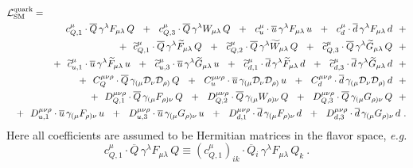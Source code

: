 \documentclass[12pt,preprintnumbers,nofootinbib]{revtex4}
\newcommand{\wt}{\widetilde}
\newcommand{\ov}{\overline}
\newcommand{\md}{\mathcal{D}}
\begin{document}
\begin{eqnarray}
\nonumber
\lefteqn{
	\mathcal{L}_{\rm SM}^{\rm quark} =
	}
	\\
\nonumber
	&&
	\phantom{+~~}
	c_{Q,1}^\mu \cdot
	\ov{Q}\, \gamma^\lambda F_{\mu\lambda}\, Q 
	~~+~~
	c_{Q,3}^\mu \cdot
	\ov{Q}\, \gamma^\lambda W_{\mu\lambda}\, Q 
	~~+~~
	c_{u}^\mu \cdot
	\ov{u}\, \gamma^\lambda F_{\mu\lambda}\, u
	~~+~~ 
	c_{d}^\mu \cdot
	\ov{d}\, \gamma^\lambda F_{\mu\lambda}\, d
	~~+
	\\
\label{SM_quark}
	&&
	+~~
	\wt{c}_{Q,1}^\mu \cdot
	\ov{Q}\, \gamma^\lambda \wt{F}_{\mu\lambda}\, Q 
	~~+~~
	\wt{c}_{Q,2}^\mu \cdot
	\ov{Q}\, \gamma^\lambda \wt{W}_{\mu\lambda}\, Q 
	~~+~~
	\wt{c}_{Q,3}^\mu \cdot
	\ov{Q}\, \gamma^\lambda \wt{G}_{\mu\lambda}\, Q 
	~~+
	\\
\nonumber
	&&
	+~~
	\wt{c}_{u,1}^\mu \cdot
	\ov{u}\, \gamma^\lambda \wt{F}_{\mu\lambda}\, u
	~~+~~ 
	\wt{c}_{u,3}^\mu \cdot
	\ov{u}\, \gamma^\lambda \wt{G}_{\mu\lambda}\, u
	~~+~~ 
	\wt{c}_{d,1}^\mu \cdot
	\ov{d}\, \gamma^\lambda \wt{F}_{\mu\lambda}\, d
	~~+~~ 
	\wt{c}_{d,3}^\mu \cdot
	\ov{d}\, \gamma^\lambda \wt{G}_{\mu\lambda}\, d
	~~+
	\\
\nonumber
	&&
	+~~
	C_Q^{\mu\nu\rho} \cdot
	\ov{Q}\, \gamma_{(\mu} \md_\nu \md_{\rho)}\, Q
	~~+~~
	C_u^{\mu\nu\rho} \cdot
	\ov{u}\, \gamma_{(\mu} \md_\nu \md_{\rho)}\, u
	~~+~~
	C_d^{\mu\nu\rho} \cdot
	\ov{d}\, \gamma_{(\mu} \md_\nu \md_{\rho)}\, d
	~~+
	\\
\nonumber
	&&
	+~~
	D_{Q,1}^{\mu\nu\rho} \cdot
	\ov{Q}\, \gamma_{(\mu} F_{\rho)\nu}\, Q
	~~+~~
	D_{Q,2}^{\mu\nu\rho} \cdot
	\ov{Q}\, \gamma_{(\mu} W_{\rho)\nu}\, Q
	~~+~~
	D_{Q,3}^{\mu\nu\rho} \cdot
	\ov{Q}\, \gamma_{(\mu} G_{\rho)\nu}\, Q
	~~+
	\\
\nonumber
	&&
	+~~
	D_{u,1}^{\mu\nu\rho} \cdot
	\ov{u}\, \gamma_{(\mu} F_{\rho)\nu}\, u
	~~+~~
	D_{u,3}^{\mu\nu\rho} \cdot
	\ov{u}\, \gamma_{(\mu} G_{\rho)\nu}\, u
	~~+~~
	D_{d,1}^{\mu\nu\rho} \cdot
	\ov{d}\, \gamma_{(\mu} F_{\rho)\nu}\, d
	~~+~~
	D_{d,3}^{\mu\nu\rho} \cdot
	\ov{d}\, \gamma_{(\mu} G_{\rho)\nu}\, d
	~.
\end{eqnarray}
	Here all coefficients are assumed to be Hermitian matrices in the 
	flavor space, {\it e.g.}
\[
	c_{Q,1}^\mu \cdot
	\ov{Q}\, \gamma^\lambda F_{\mu\lambda}\, Q 
	\equiv
	\left(c_{Q,1}^\mu\right)_{ik} \cdot
	\ov{Q}{}_i\, \gamma^\lambda F_{\mu\lambda}\, Q_k
	~. 
\]
\end{document}
